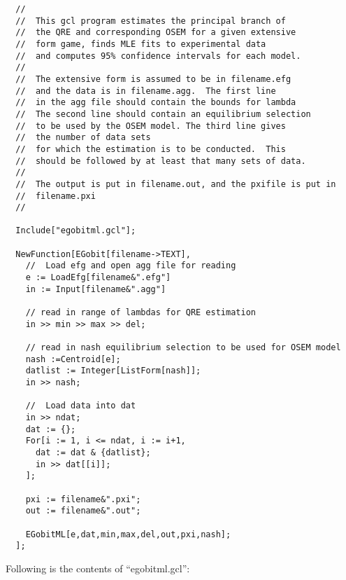 \begin{verbatim}
  //
  //  This gcl program estimates the principal branch of
  //  the QRE and corresponding OSEM for a given extensive 
  //  form game, finds MLE fits to experimental data 
  //  and computes 95% confidence intervals for each model. 
  //
  //  The extensive form is assumed to be in filename.efg
  //  and the data is in filename.agg.  The first line
  //  in the agg file should contain the bounds for lambda 
  //  The second line should contain an equilibrium selection 
  //  to be used by the OSEM model. The third line gives 
  //  the number of data sets
  //  for which the estimation is to be conducted.  This 
  //  should be followed by at least that many sets of data.
  //
  //  The output is put in filename.out, and the pxifile is put in
  //  filename.pxi
  //
  
  Include["egobitml.gcl"];

  NewFunction[EGobit[filename->TEXT],
    //  Load efg and open agg file for reading
    e := LoadEfg[filename&".efg"]
    in := Input[filename&".agg"]

    // read in range of lambdas for QRE estimation
    in >> min >> max >> del;

    // read in nash equilibrium selection to be used for OSEM model
    nash :=Centroid[e];
    datlist := Integer[ListForm[nash]];
    in >> nash;

    //  Load data into dat
    in >> ndat;
    dat := {};
    For[i := 1, i <= ndat, i := i+1,
      dat := dat & {datlist};
      in >> dat[[i]];
    ];

    pxi := filename&".pxi";
    out := filename&".out";

    EGobitML[e,dat,min,max,del,out,pxi,nash];
  ];
\end{verbatim}

\newpage
\noindent
Following is the contents of ``egobitml.gcl'':

